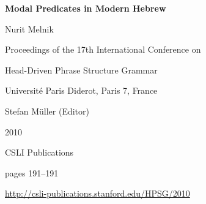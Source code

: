 \documentclass[a4paper,11pt]{article}
\begin{document}
\begin{center}
  {\huge\bf Modal Predicates in Modern Hebrew\par}

  \bigskip

  {\LARGE Nurit Melnik\par}

  \vspace*{3\bigskipamount}

  Proceedings of the 17th International Conference on\par Head-Driven Phrase Structure Grammar

  \bigskip

  Universit\'{e} Paris Diderot, Paris 7, France

  \medskip

  Stefan Müller (Editor)

  \medskip

  2010

  \medskip

  CSLI Publications

  \medskip

  pages 191--191

  \medskip

  \url{http://csli-publications.stanford.edu/HPSG/2010}
\end{center}

\newpage

        
\end{document}
